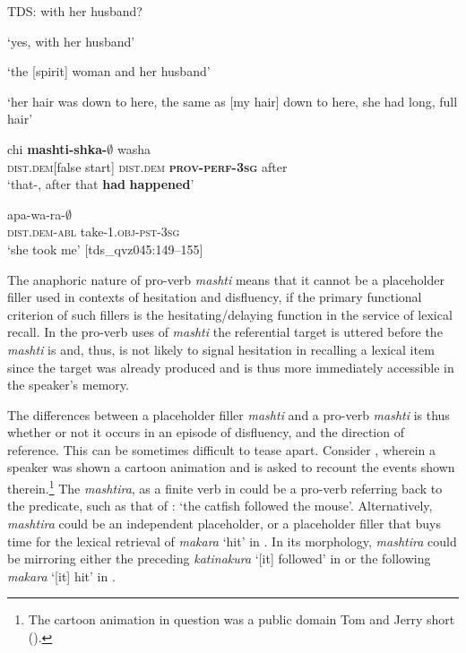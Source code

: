 \documentclass[output=paper]{langscibook}
\begin{document}
TDS: with her husband?
\medskip

\ex \label{ex:rice:15d} ‘yes, with her husband’
\medskip

\ex  \label{ex:rice:15e}
‘the [spirit] woman and her husband’
\medskip

\ex  \label{ex:rice:15f}
‘her hair was down to here, the same as [my hair] down to here, she had long, full hair’
\medskip

\ex \label{ex:rice:15g}
 {chi} {\textbf{mashti-shka-${\emptyset}$}} {washa}\\
{\textsc{dist.dem}[false start]} {\textsc{dist.dem}} {\textbf{\textsc{prov-perf-3sg}}} {after}\\
\glt  ‘that-, after that \textbf{had} \textbf{happened}’
\medskip

\ex \label{ex:rice:15h}
 {apa-wa-ra-${\emptyset}$}\\
{\textsc{dist.dem-abl}} {take-\textsc{1.obj-pst-3sg}}\\
\glt  ‘she took me’ [tds\_qvz045:149--155]
\z
\z

The anaphoric nature of pro-verb \textit{mashti} means that it cannot be a placeholder filler used in contexts of hesitation and disfluency, if the primary functional criterion of such fillers is the hesitating/delaying function in the service of lexical recall. In the pro-verb uses of \textit{mashti} the referential target is uttered before the \textit{mashti} is and, thus, is not likely to signal hesitation in recalling a lexical item since the target was already produced and is thus more immediately accessible in the speaker’s memory.

The differences between a placeholder filler \textit{mashti} and a pro-verb \textit{mashti} is thus whether or not it occurs in an episode of disfluency, and the direction of reference. This can be sometimes difficult to tease apart. Consider , wherein a speaker was shown a cartoon animation and is asked to recount the events shown therein.\footnote{The cartoon animation in question was a public domain Tom and Jerry short (\citealt{Barbera1947}).} The \textit{mashtira}, as a finite verb in  could be a pro-verb referring back to the predicate, such as that of : ‘the catfish followed the mouse’. Alternatively, \textit{mashtira} could be an independent placeholder, or a placeholder filler that buys time for the lexical retrieval of \textit{makara} ‘hit’ in . In its morphology, \textit{mashtira} could be mirroring either the preceding \textit{katinakura} ‘[it] followed’ in  or the following \textit{makara} ‘[it] hit’ in .
\end{document}
